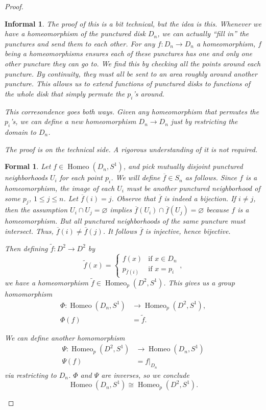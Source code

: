\documentclass{amsart}
\DeclareMathOperator{\Homeo}{Homeo}
\newtheorem*{formal}{Formal}
\newtheorem*{informal}{Informal}
\begin{document}
\begin{proof}
	\begin{informal}
	   The proof of this is a bit technical, but the idea is this. Whenever we
		have a homeomorphism of the punctured disk \(D_n\), we can actually
		``fill in'' the punctures and send them to each other. For any \(f:
		D_n\to D_n\) a homeomorphism, \(f\) being a homeomorphisms ensures each
		of these punctures has one and only one other puncture they can go to. We
		find this by checking all the points around each puncture. By continuity,
		they must all be sent to an area roughly around another puncture. This
		allows us to extend functions of punctured disks to functions of
		the whole disk that simply permute the \(p_i\)'s around.

		This corresondence goes both ways. Given any homeomorphism that permutes
		the \(p_i\)'s, we can define a new homeomorphism \(D_n\to D_n\) just by
		restricting the domain to \(D_n\).

		The proof is on the technical side. A rigorous understanding of it is not
		required.
	\end{informal}
	\begin{formal}
	   Let \(f\in\Homeo(D_n, S^1)\), and pick mutually disjoint punctured
		neighborhoods \(U_i\) for each point \(p_i\). We will define
		\(\overline{f}\in S_n\) as follows. Since \(f\) is a
		homeomorphism, the image of
		each \(U_i\) must be another punctured neighborhood of some \(p_j\), \(1\le
		j\le n\). Let \(\overline{f}(i) = j\). Observe that \(\overline{f}\) is
		indeed a bijection. If \(i\ne j\), then the assumption \(U_i\cap U_j =
		\varnothing\) implies \(\overline{f}(U_i)\cap \overline{f}(U_j) =
		\varnothing\) because \(f\) is a homeomorphism. But all punctured
		neighborhoods of the same puncture must intersect. Thus,
		\(\overline{f}(i)\ne \overline{f}(j)\). It follows \(\overline{f}\) is
		injective, hence bijective.

		Then defining \(\widetilde{f}: D^2\to D^2\) by 
		\[
			\widetilde{f}(x) = 
			\begin{cases}
				f(x) &\text{if }x\in D_n\\
				p_{\overline{f}(i)} &\text{if }x = p_i
			\end{cases},
		\] 
		we have a homeomorphism \(\widetilde{f}\in\Homeo_p(D^2, S^1)\). This
		gives us a group homomorphism 
		\begin{align*}
			\Phi: \Homeo(D_n, S^1)&\to \Homeo_p(D^2, S^1),\\
			\Phi(f) &= \widetilde{f}.
		\end{align*}

		We can define another homomorphism 
		\begin{align*}
			\Psi:\Homeo_p(D^2, S^1)&\to\Homeo(D_n, S^1)\\
			\Psi(f) &= f|_{D_n}
		\end{align*}
		via restricting to \(D_n\). \(\Phi\) and \(\Psi\) are inverses,
		so we conclude 
		\[
			\Homeo(D_n, S^1)\cong\Homeo_p(D^2, S^1).
		\] 
	\end{formal}
\end{proof}
\end{document}
